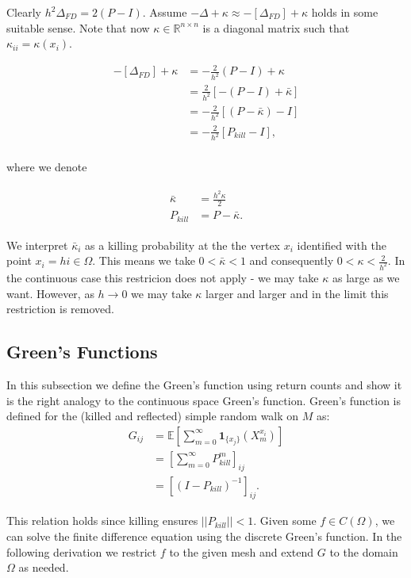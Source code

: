 \documentclass[paper=a4, fontsize=11pt]{scrartcl} %
\numberwithin{equation}{section} %
\numberwithin{figure}{section} %
\numberwithin{table}{section} %
\begin{document}
Clearly $h^2\Delta_{FD} = 2(P-I)$. Assume 
$-\Delta + \kappa \approx -[\Delta_{FD}] + \kappa$ holds in some suitable sense. Note
that now $\kappa \in \mathbb{R}^{n \times n}$ is a diagonal matrix such that 
$\kappa_{ii} =  \kappa(x_i)$.

\begin{align*}
  -[\Delta_{FD}] + \kappa  &= -\frac{2}{h^2}(P-I) + \kappa \\
  &= \frac{2}{h^2}[-(P-I) + \bar{\kappa}] \\
  &=-\frac{2}{h^2}[(P- \bar{\kappa}) -I] \\
  &=-\frac{2}{h^2}[P_{kill} -I], \\
\end{align*}


where we denote

\begin{align}\label{kappas}
  \begin{split}
    \bar{\kappa} &= \frac{h^2\kappa}{2} \\
    P_{kill} &= P - \bar{\kappa}.
  \end{split}
\end{align}

We interpret $\bar{\kappa}_i$ as a killing probability at the the vertex $x_i$ identified
with the point $x_i = hi \in \Omega$. This means we take $0 < \bar{\kappa} < 1$ and
consequently $ 0 < \kappa < \frac{2}{h^2}$. In the continuous case this restricion
does not apply - we may
take $\kappa$ as large as we want. However,
as $h \to 0$ we may take $\kappa$ larger and larger and in the limit this
restriction is removed. 

\subsection{Green's Functions}
In this subsection we define the Green's function using return counts and show
it is the right analogy to the continuous space Green's function.
Green's function is defined for the (killed and reflected) simple random walk on $M$ as:
\begin{align*}
  G_{ij}  &= \mathbb{E} [ \sum_{m=0}^{\infty} \mathbf{1}_{ \{x_j\} }( X^{x_i}_m)] \\
  &= [\sum_{m=0}^{\infty} P_{kill}^m ]_{ij} \\
  &= [(I - P_{kill})^{-1}]_{ij}.
\end{align*}

This relation holds since killing ensures $||P_{kill}|| < 1$. Given some $f \in C(\Omega)$, we can 
solve the finite difference equation using the discrete Green's function. In the following derivation 
we restrict $f$ to the given mesh and extend $G$ to the domain $\Omega$ as needed.
\end{document}

